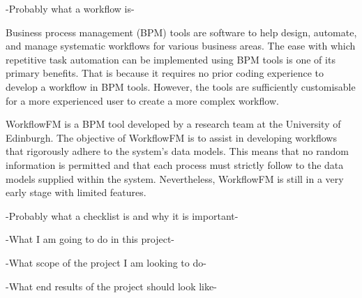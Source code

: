 





-Probably what a workflow is-

Business process management (BPM) tools are software to help design, automate, and manage systematic workflows for various business areas. The ease with which repetitive task automation can be implemented using BPM tools is one of its primary benefits. That is because it requires no prior coding experience to develop a workflow in BPM tools. However, the tools are sufficiently customisable for a more experienced user to create a more complex workflow.


WorkflowFM \cite{papapanagiotou2017workflowfm} is a BPM tool developed by a research team at the University of Edinburgh.
The objective of WorkflowFM is to assist in developing workflows that rigorously adhere to the system's data models. This means that no random information is permitted and that each process must strictly follow to the data models supplied within the system.
Nevertheless, WorkflowFM is still in a very early stage with limited features.

-Probably what a checklist is and why it is important-

-What I am going to do in this project-

-What scope of the project I am looking to do-

-What end results of the project should look like-
